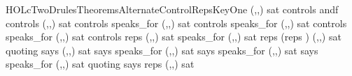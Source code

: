 \newcommand{\HOLcTwoDrulesDate}{06 October 2012}
\newcommand{\HOLcTwoDrulesTime}{17:44}
\begin{SaveVerbatim}{HOLcTwoDrulesTheoremsAlternateControlRepsKeyOne}
\HOLTokenTurnstile{} (,,) sat  controls  andf  controls  \HOLTokenImp{}
   (,,) sat  controls  speaks_for  \HOLTokenImp{}
   (,,) sat  controls  speaks_for  \HOLTokenImp{}
   (,,) sat  controls  speaks_for  \HOLTokenImp{}
   (,,) sat  controls reps    \HOLTokenImp{}
   (,,) sat  speaks_for  \HOLTokenImp{}
   (,,) sat reps   (reps   ) \HOLTokenImp{}
   (,,) sat  quoting  says  \HOLTokenImp{}
   (,,) sat  says  speaks_for  \HOLTokenImp{}
   (,,) sat  says  speaks_for  \HOLTokenImp{}
   (,,) sat  says  speaks_for  \HOLTokenImp{}
   (,,) sat  quoting  says reps    \HOLTokenImp{}
   (,,) sat 
\end{SaveVerbatim}
\newcommand{\HOLcTwoDrulesTheoremsAlternateControlRepsKeyOne}{\UseVerbatim{HOLcTwoDrulesTheoremsAlternateControlRepsKeyOne}}

